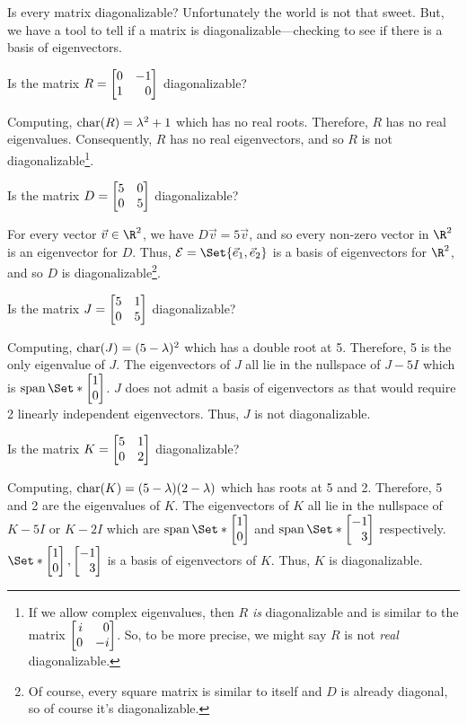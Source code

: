 Is every matrix diagonalizable? Unfortunately the world is not that sweet. But, we have a tool to tell if a matrix is
diagonalizable---checking to see if there is a basis of eigenvectors.

\begin{example}
	Is the matrix $R=\mat{0&-1\\1&0}$ diagonalizable?

	Computing, $\operatorname{char}(R)=\lambda^2+1$ which has no real roots. Therefore,
	$R$ has no real eigenvalues. Consequently, $R$ has no real eigenvectors,
	and so $R$ is not diagonalizable\footnote{ If we allow complex eigenvalues, then $R$ \emph{is}
	diagonalizable and is similar to the matrix $\mat{i&0\\0&-i}$. So, to be more precise, we
	might say $R$ is not \emph{real} diagonalizable.}.
\end{example}

\begin{example}
	Is the matrix $D=\mat{5&0\\0&5}$ diagonalizable?

	For every vector $\vec v\in \R^2$, we have $D\vec v=5\vec v$, and so every
	non-zero vector in $\R^2$ is an eigenvector for $D$. Thus, $\mathcal E=\Set{\xhat, \yhat}$
	is a basis of eigenvectors for $\R^2$, and so $D$ is diagonalizable\footnote{ Of course, every
	square matrix is similar to itself and $D$ is already diagonal, so of course it's diagonalizable.}.
\end{example}

\begin{example}
	Is the matrix $J=\mat{5&1\\0&5}$ diagonalizable?
	
	Computing, $\operatorname{char}(J)=(5-\lambda)^2$ which has a double root at 5. Therefore, 5 is the
	only eigenvalue of $J$. The eigenvectors of $J$ all lie in the nullspace of $J-5I$ which 
	is $\Span\Set*{\mat{1\\0}}$. $J$ does not admit a basis of eigenvectors as that would require
	2 linearly independent eigenvectors. Thus, $J$ is not diagonalizable.
\end{example}

\begin{example}
	Is the matrix $K=\mat{5&1\\0&2}$ diagonalizable?
	
	Computing, $\operatorname{char}(K)=(5-\lambda)(2-\lambda)$ which has roots at 5 and 2. Therefore, 5 and 2 are
	the eigenvalues of $K$. The eigenvectors of $K$ all lie in the nullspace of $K-5I$ or $K-2I$ which are 
	$\Span\Set*{\mat{1\\0}}$ and $\Span\Set*{\mat{-1\\3}}$ respectively.
	$\Set*{\mat{1\\0},\mat{-1\\3}}$ is a basis of eigenvectors of $K$. Thus, $K$ is diagonalizable.
\end{example}

